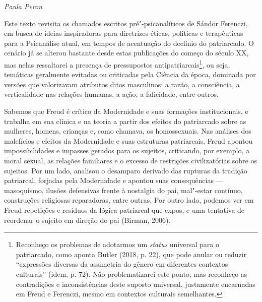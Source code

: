 \begin{flushright}
\emph{Paula Peron}
\end{flushright}

Este texto revisita os chamados escritos pré"-psicanalíticos de Sándor
Ferenczi, em busca de ideias inspiradoras para diretrizes éticas,
politicas e terapêuticas para a Psicanálise atual, em tempos de
acentuação do declínio do patriarcado. O cenário já se alterou bastante
desde estas publicações do começo do século XX, mas nelas ressaltarei a
presença de pressupostos antipatriarcais\footnote{Reconheço os problemas
  de adotarmos um \emph{status} universal para o patriarcado, como
  aponta Butler (2018, p. 22), que pode anular ou reduzir ``expressões
  diversas da assimetria do gênero em diferentes contextos culturais''
  (idem, p. 72). Não problematizarei este ponto, mas reconheço as
  contradições e inconsistências deste suposto universal, justamente
  encarnadas em Freud e Ferenczi, mesmo em contextos culturais
  semelhantes.}, ou seja, temáticas geralmente evitadas ou criticadas
pela Ciência da época, dominada por versões que valorizavam atributos
ditos masculinos: a razão, a consciência, a verticalidade nas relações
humanas, a ação, a falicidade, entre outros.

Sabemos que Freud é crítico da Modernidade e suas formações
institucionais, e trabalha em sua clínica e na teoria a partir dos
efeitos do patriarcado sobre as mulheres, homens, crianças e, como
chamava, os homossexuais. Nas análises dos malefícios e efeitos da
Modernidade e suas estruturas patriarcais, Freud apontou
impossibilidades e impasses gerados para os sujeitos, criticando, por
exemplo, a moral sexual, as relações familiares e o excesso de
restrições civilizatórias sobre os sujeitos. Por um lado, analisou o
desamparo derivado das rupturas da tradição patriarcal, forjadas pela
Modernidade e apontou suas consequências --- masoquismo, ilusões
defensivas frente à nostalgia do pai, mal"-estar contínuo, construções
religiosas reparadoras, entre outras. Por outro lado, podemos ver em
Freud repetições e resíduos da lógica patriarcal que expos, e uma
tentativa de reordenar o sujeito em direção do pai (Birman, 2006).

